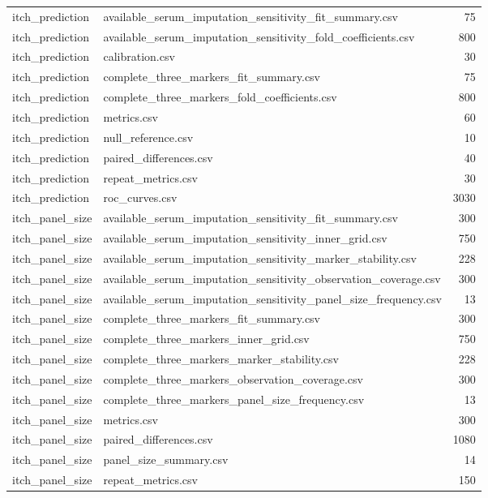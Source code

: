 \begin{longtable}{p{20mm}p{115mm}r}
itch\_prediction & available\_serum\_imputation\_sensitivity\_fit\_summary.csv & 75 \\
itch\_prediction & available\_serum\_imputation\_sensitivity\_fold\_coefficients.csv & 800 \\
itch\_prediction & calibration.csv & 30 \\
itch\_prediction & complete\_three\_markers\_fit\_summary.csv & 75 \\
itch\_prediction & complete\_three\_markers\_fold\_coefficients.csv & 800 \\
itch\_prediction & metrics.csv & 60 \\
itch\_prediction & null\_reference.csv & 10 \\
itch\_prediction & paired\_differences.csv & 40 \\
itch\_prediction & repeat\_metrics.csv & 30 \\
itch\_prediction & roc\_curves.csv & 3030 \\
itch\_panel\_size & available\_serum\_imputation\_sensitivity\_fit\_summary.csv & 300 \\
itch\_panel\_size & available\_serum\_imputation\_sensitivity\_inner\_grid.csv & 750 \\
itch\_panel\_size & available\_serum\_imputation\_sensitivity\_marker\_stability.csv & 228 \\
itch\_panel\_size & available\_serum\_imputation\_sensitivity\_observation\_coverage.csv & 300 \\
itch\_panel\_size & available\_serum\_imputation\_sensitivity\_panel\_size\_frequency.csv & 13 \\
itch\_panel\_size & complete\_three\_markers\_fit\_summary.csv & 300 \\
itch\_panel\_size & complete\_three\_markers\_inner\_grid.csv & 750 \\
itch\_panel\_size & complete\_three\_markers\_marker\_stability.csv & 228 \\
itch\_panel\_size & complete\_three\_markers\_observation\_coverage.csv & 300 \\
itch\_panel\_size & complete\_three\_markers\_panel\_size\_frequency.csv & 13 \\
itch\_panel\_size & metrics.csv & 300 \\
itch\_panel\_size & paired\_differences.csv & 1080 \\
itch\_panel\_size & panel\_size\_summary.csv & 14 \\
itch\_panel\_size & repeat\_metrics.csv & 150 \\

\end{longtable}
